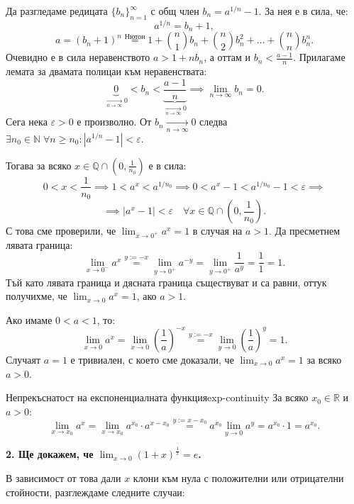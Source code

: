 Да разгледаме редицата $\{b_n\}_{n=1}^{\infty}$ с общ член $b_n = a^{1/n} - 1$. За нея е в сила, че:
\[
a^{1/n} = b_n + 1,
\]
\[
a = (b_n + 1)^n \overset{\text{Нютон}}{=} 1 + \binom{n}{1} b_n + \binom{n}{2} b_n^2 + \dots + \binom{n}{n} b_n^n.
\]
Очевидно е в сила неравенството $a > 1 + n b_n$, а оттам и $b_n < \frac{a - 1}{n}$. Прилагаме лемата за двамата полицаи към неравенствата:
\[
\underbrace{0}_{\xrightarrow[n \to \infty]{} 0} < b_n < \underbrace{\frac{a - 1}{n}}_{\xrightarrow[n \to \infty]{} 0} \implies \lim_{n \to \infty} b_n = 0.
\]
Сега нека $\varepsilon > 0$ е произволно. От $b_n \xrightarrow[n \to \infty]{} 0$ следва $\exists n_0 \in \mathbb{N} \; \forall n \ge n_0 : |a^{1/n} - 1| < \varepsilon$.

Тогава за всяко $x \in \mathbb{Q} \cap \left( 0, \frac{1}{n_0} \right)$ е в сила:
\[
0 < x < \frac{1}{n_0} \implies 1 < a^x < a^{1/n_0} \implies 0 < a^x - 1 < a^{1/n_0} - 1 < \varepsilon \implies
\]
\[
\implies |a^x - 1| < \varepsilon \quad \forall x \in \mathbb{Q} \cap \left( 0, \frac{1}{n_0} \right).
\]
С това сме проверили, че $\lim_{x \to 0^+} a^x = 1$ в случая на $a > 1$. Да пресметнем лявата граница:
\[
\lim_{x \to 0^-} a^x \overset{y := -x}{=} \lim_{y \to 0^+} a^{-y} = \lim_{y \to 0^+} \frac{1}{a^y} = \frac{1}{1} = 1.
\]
Тъй като лявата граница и дясната граница съществуват и са равни, оттук получихме, че $\lim_{x \to 0} a^x = 1$, ако $a > 1$.

Ако имаме $0 < a < 1$, то:
\[
\lim_{x \to 0} a^x = \lim_{x \to 0} \left( \frac{1}{a} \right)^{-x} \overset{y := -x}{=} \lim_{y \to 0} \left( \frac{1}{a} \right)^y = 1.
\]
Случаят $a = 1$ е тривиален, с което сме доказали, че $\lim_{x \to 0} a^x = 1$ за всяко $a > 0$.

\begin{corollary}{Непрекъснатост на експоненциалната функция}{exp-continuity}
За всяко $x_0 \in \mathbb{R}$ и $a > 0$:
\[
\lim_{x \to x_0} a^x = \lim_{x \to x_0} a^{x_0} \cdot a^{x - x_0} \overset{y := x - x_0}{=} a^{x_0} \lim_{y \to 0} a^y = a^{x_0} \cdot 1 = a^{x_0}.
\]
\end{corollary}

\medskip
\noindent\textbf{2. Ще докажем, че $\lim_{x \to 0} (1 + x)^{\frac{1}{x}} = e$.}

В зависимост от това дали $x$ клони към нула с положителни или отрицателни стойности, разглеждаме следните случаи:

